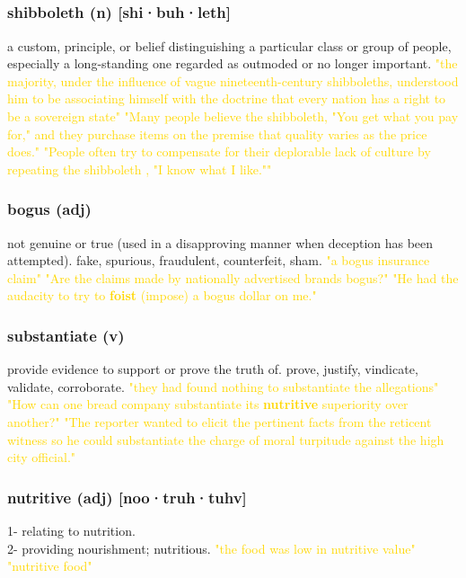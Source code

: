 \documentclass{proc}
\begin{document}
	\newpage
	\subsection{}
	\subsubsection{\textcolor{brickred}{shibboleth} (n) [shi·buh·leth]}
	a custom, principle, or belief distinguishing a particular class or group of people, especially a long-standing one regarded as outmoded or no longer important.
	\textcolor{gold}{"the majority, under the influence of vague nineteenth-century shibboleths, understood him to be associating himself with the doctrine that every nation has a right to be a sovereign state" "Many people believe the shibboleth, "You get what you pay for," and they purchase items on the premise that quality varies as the price does." "People often try to compensate for their deplorable lack of culture by repeating the shibboleth , "I know what I like.""}
	
	\subsubsection{\textcolor{brickred}{bogus} (adj)}
	not genuine or true (used in a disapproving manner when deception has been attempted). fake, spurious, fraudulent, counterfeit, sham.
	\textcolor{gold}{"a bogus insurance claim" "Are the claims made  by  nationally advertised brands bogus?" "He had the audacity to try to \textbf{foist} (impose) a bogus dollar on me."}
	
	\subsubsection{\textcolor{brickred}{substantiate} (v)}
	provide evidence to support or prove the truth of. prove, justify, vindicate, validate, corroborate.
	\textcolor{gold}{"they had found nothing to substantiate the allegations" "How can one bread company substantiate its \textbf{nutritive} superiority over another?" "The reporter wanted to elicit the pertinent facts from the reticent witness so he could substantiate the charge of moral turpitude against the high city official."}
	
	\subsubsection{\textcolor{brickred}{nutritive} (adj) [noo·truh·tuhv]}
	1- relating to nutrition.\\
	2- providing nourishment; nutritious.
	\textcolor{gold}{"the food was low in nutritive value" "nutritive food"}
	
\end{document}
